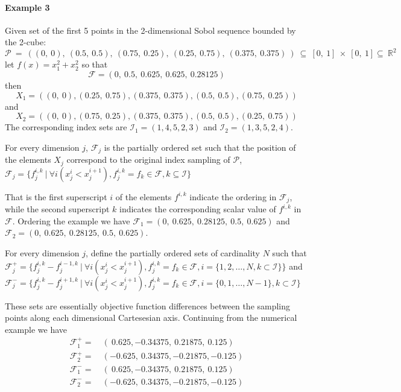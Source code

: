 \paragraph{Example 3} Given set of the first 5 points in the 2-dimensional Sobol sequence bounded by the 2-cube: $$\mathcal{P}~=~\left((0,~0),~(0.5,~0.5),~(0.75,~0.25),~(0.25,~0.75),~(0.375,~0.375)~\right)~\subseteq~[0,~1]~\times~[0,~1] \subseteq~\mathbb{R}^2$$ let $f(x) = x_1^2 + x_2^2$ so that
$$\mathcal{F} = (0,~0.5,~0.625,~0.625,~0.28125)$$
then 
$$X_1 = ((0,~0), (0.25,~0.75), (0.375,~0.375), (0.5,~0.5), (0.75,~0.25))$$
and 
$$X_2 = ((0,~0), (0.75,~0.25), (0.375,~0.375), (0.5,~0.5), (0.25,~0.75))$$
The corresponding index sets are $\mathcal{I}_1 = (1, 4, 5, 2, 3)$ and $\mathcal{I}_2 = (1, 3, 5, 2, 4)$.  

\begin{definition} \label{def:atgo3}
For every dimension $j$, $\mathcal{F}_j$ is the partially ordered set such that the position of the elements $X_j$ correspond to the original index sampling of $ \mathcal{P}$, $\mathcal{F}_j = \{f^{i, k}_j~|~\forall i (x^i_j < x^{i + 1}_j), f^{i, k}_j = f_k \in \mathcal{F}, k \subseteq  \mathcal{I} \}$ 
\end{definition}
That is the first superscript $i$ of the elements $f^{i, k}$ indicate the ordering in $\mathcal{F}_j$, while the second superscript $k$ indicates the corresponding scalar value of $f^{i, k}$ in $ \mathcal{F}$. Ordering the example we have
$\mathcal{F}_1 = (0,~0.625,~0.28125,~0.5,~0.625)$ and  $\mathcal{F}_2 = (0,~0.625,~0.28125,~0.5,~0.625)$.


\begin{definition}
For every dimension $j$, define the partially ordered sets of cardinality $N$ such that $\mathcal{F}^+_j = \{{f}^{i, k}_j - {f}^{i - 1, k}_j~|~\forall i (x^i_j < x^{i + 1}_j), f^{i, k}_j = f_k \in \mathcal{F}, i = \{1, 2, \dots, N , k \subset \mathcal{I} \} \}$ and $\mathcal{F}^-_j = \{{f}^{i, k}_j - {f}^{i + 1, k}_j ~|~\forall i (x^i_j < x^{i + 1}_j), f^{i, k}_j = f_k \in \mathcal{F}, i = \{0, 1, \dots, N - 1 \}, k \subset \mathcal{I} \}$ \label{def:atgo4}
\end{definition} 
These sets are essentially objective function differences between the sampling points along each dimensional Cartesesian axis. Continuing from the numerical example we have
\begin{align} \nonumber
\mathcal{F}_1^+ =&~ (~0.625, -0.34375, ~0.21875, ~0.125) \\  \nonumber
\mathcal{F}_2^+ =&~ (-0.625, ~0.34375, -0.21875, -0.125) \\  \nonumber
\mathcal{F}_1^- =&~ (~0.625, -0.34375,  ~0.21875, ~0.125) \\  \nonumber
\mathcal{F}_2^- =&~ (-0.625, ~0.34375, -0.21875, -0.125) 
\end{align}

